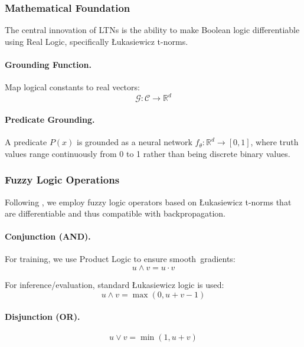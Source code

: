 \documentclass[12pt, a4paper]{article}
\begin{document}
\subsubsection{Mathematical Foundation}

The central innovation of LTNs \citep{badreddine2022logic} is the ability to make Boolean logic differentiable using Real Logic, specifically Łukasiewicz t-norms.

\paragraph{Grounding Function.}
Map logical constants to real vectors:
\begin{equation}
	\mathcal{G}: \mathcal{C} \to \mathbb{R}^d
	\label{eq:grounding}
\end{equation}

\paragraph{Predicate Grounding.}
A predicate $P(x)$ is grounded as a neural network $f_\theta: \mathbb{R}^d \to [0,1]$, where truth values range continuously from 0 to 1 rather than being discrete binary values.

\subsubsection{Fuzzy Logic Operations}

Following \citet{badreddine2022logic}, we employ fuzzy logic operators based on Łukasiewicz t-norms that are differentiable and thus compatible with backpropagation.

\paragraph{Conjunction (AND).}
For training, we use Product Logic to ensure smooth~gradients:
\begin{equation}
	u \land v = u \cdot v
	\label{eq:and_product}
\end{equation}

For inference/evaluation, standard Łukasiewicz logic is used:
\begin{equation}
	u \land v = \max(0, u + v - 1)
	\label{eq:and_lukasiewicz}
\end{equation}

\paragraph{Disjunction (OR).}
\begin{equation}
	u \lor v = \min(1, u + v)
	\label{eq:or}
\end{equation}
\end{document}
